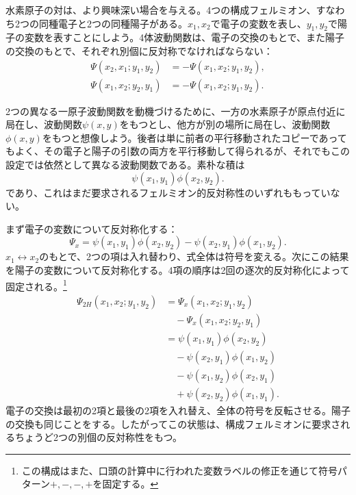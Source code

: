 水素原子の対は、より興味深い場合を与える。4つの構成フェルミオン、すなわち2つの同種電子と2つの同種陽子がある。\(x_1,x_2\)で電子の変数を表し、\(y_1,y_2\)で陽子の変数を表すことにしよう。4体波動関数は、電子の交換のもとで、また陽子の交換のもとで、それぞれ別個に反対称でなければならない：
\begin{align}
\Psi(x_2,x_1;y_1,y_2)
&=-\Psi(x_1,x_2;y_1,y_2),\\
\Psi(x_1,x_2;y_2,y_1)
&=-\Psi(x_1,x_2;y_1,y_2).
\end{align}

2つの異なる一原子波動関数を動機づけるために、一方の水素原子が原点付近に局在し、波動関数\(\psi(x,y)\)をもつとし、他方が別の場所に局在し、波動関数\(\phi(x,y)\)をもつと想像しよう。後者は単に前者の平行移動されたコピーであってもよく、その電子と陽子の引数の両方を平行移動して得られるが、それでもこの設定では依然として異なる波動関数である。素朴な積は
\begin{equation}
\psi(x_1,y_1)\phi(x_2,y_2).
\end{equation}
であり、これはまだ要求されるフェルミオン的反対称性のいずれももっていない。

まず電子の変数について反対称化する：
\begin{equation}
\Psi_x=
\psi(x_1,y_1)\phi(x_2,y_2)
-\psi(x_2,y_1)\phi(x_1,y_2).
\end{equation}
\(x_1\leftrightarrow x_2\)のもとで、2つの項は入れ替わり、式全体は符号を変える。次にこの結果を陽子の変数について反対称化する。4項の順序は2回の逐次的反対称化によって固定される。\footnote{この構成はまた、口頭の計算中に行われた変数ラベルの修正を通じて符号パターン\(+,-,-,+\)を固定する。}
\begin{align}
\Psi_{2H}(x_1,x_2;y_1,y_2)
&=\Psi_x(x_1,x_2;y_1,y_2)\nonumber\\
&\quad{}-\Psi_x(x_1,x_2;y_2,y_1)\\
&=\psi(x_1,y_1)\phi(x_2,y_2)\nonumber\\
&\quad{}-\psi(x_2,y_1)\phi(x_1,y_2)\nonumber\\
&\quad{}-\psi(x_1,y_2)\phi(x_2,y_1)\nonumber\\
&\quad{}+\psi(x_2,y_2)\phi(x_1,y_1).
\label{eq:two-hydrogen-antisymmetrized}
\end{align}
電子の交換は最初の2項と最後の2項を入れ替え、全体の符号を反転させる。陽子の交換も同じことをする。したがってこの状態は、構成フェルミオンに要求されるちょうど2つの別個の反対称性をもつ。

\begin{classroomqa}
\end{classroomqa}

